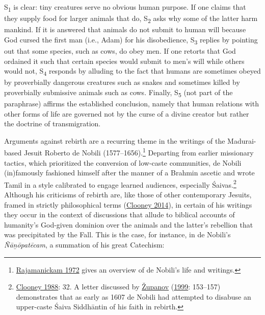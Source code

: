 S\textsubscript{1} is clear: tiny creatures serve no obvious human purpose. If one claims that they supply food for larger animals that do, S\textsubscript{2} asks why some of the latter harm mankind. If it is answered that animals do not submit to human will because God cursed the first man (i.e., Adam) for his disobedience, S\textsubscript{3} replies by pointing out that some species, such as cows, do obey men. If one retorts that God ordained it such that certain species would submit to men’s will while others would not, S\textsubscript{4} responds by alluding to the fact that humans are sometimes obeyed by proverbially dangerous creatures such as snakes and sometimes killed by proverbially submissive animals such as cows. Finally, S\textsubscript{5} (not part of the paraphrase) affirms the established conclusion, namely that human relations with other forms of life are governed not by the curse of a divine creator but rather the doctrine of transmigration.


Arguments against rebirth are a recurring theme in the writings of the Madurai-based Jesuit Roberto de Nobili (1577–1656).\footnote{%
\hyperref[Rajamanickam1972]{Rajamanickam 1972} gives an overview of de Nobili’s life and writings.
}
 Departing from earlier missionary tactics, which prioritized the conversion of low-caste communities, de Nobili (in)famously fashioned himself after the manner of a Brahmin ascetic and wrote Tamil in a style calibrated to engage learned audiences, especially Śaivas.\footnote{%
\hyperref[Clooney1988]{Clooney 1988}: 32. A letter discussed by \hyperref[Zupanov1999]{Županov} (\hyperref[Zupanov1999]{1999}: 153–157) demonstrates that as early as 1607 de Nobili had attempted to disabuse an upper-caste Śaiva Siddhāntin of his faith in rebirth.
}
 Although his criticisms of rebirth are, like those of other contemporary Jesuits, framed in strictly philosophical terms (\hyperref[Clooney2014]{Clooney 2014}), in certain of his writings they occur in the context of discussions that allude to biblical accounts of humanity’s God-given dominion over the animals and the latter’s rebellion that was precipitated by the Fall. This is the case, for instance, in de Nobili’s \emph{{Ñāṉōpatēcam}}, a summation of his great Catechism: 

